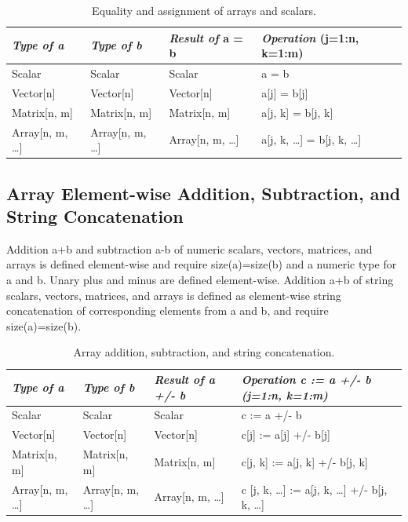 \documentclass[10pt,a4paper]{report}
\def\doublelabel#1{\label{#1}}
\begin{document}
\begin{longtable}[]{|l|l|l|l|}
\caption{Equality and assignment of arrays and scalars.}\\
\hline
\emph{Type of a} & \emph{Type of b} & \emph{Result of} a = b & \emph{Operation} (j=1:n, k=1:m)\\ \hline
\endhead
Scalar & Scalar & Scalar & a = b\\ \hline
Vector{[}n{]} & Vector{[}n{]} & Vector{[}n{]} & a{[}j{]} =
b{[}j{]}\\ \hline
Matrix{[}n, m{]} & Matrix{[}n, m{]} & Matrix{[}n, m{]} & a{[}j, k{]} =
b{[}j, k{]}\\ \hline
Array{[}n, m, \ldots{}{]} & Array{[}n, m, \ldots{}{]} & Array{[}n, m,
\ldots{}{]} & a{[}j, k, \ldots{}{]} = b{[}j, k,
\ldots{}{]}\\ \hline
\end{longtable}

\subsection{Array Element-wise Addition, Subtraction, and String Concatenation}\doublelabel{array-element-wise-addition-subtraction-and-string-concatenation}

Addition a+b and subtraction a-b of numeric scalars, vectors, matrices,
and arrays is defined element-wise and require size(a)=size(b) and a
numeric type for a and b. Unary plus and minus are defined element-wise.
Addition a+b of string scalars, vectors, matrices, and arrays is defined
as element-wise string concatenation of corresponding elements from a
and b, and require size(a)=size(b).

\begin{longtable}[]{|l|l|l|l|}
\caption{Array addition, subtraction, and string concatenation.}\\
\hline
\emph{Type of a} & \emph{Type of b} & \emph{Result of a +/- b} &
\emph{Operation c := a +/- b (j=1:n, k=1:m)}\\ \hline
\endhead
Scalar & Scalar & Scalar & c := a +/- b\\ \hline
Vector{[}n{]} & Vector{[}n{]} & Vector{[}n{]} & c{[}j{]} := a{[}j{]} +/-
b{[}j{]}\\ \hline
Matrix{[}n, m{]} & Matrix{[}n, m{]} & Matrix{[}n, m{]} & c{[}j, k{]} :=
a{[}j, k{]} +/- b{[}j, k{]}\\ \hline
Array{[}n, m, \ldots{}{]} & Array{[}n, m, \ldots{}{]} & Array{[}n, m,
\ldots{}{]} & c {[}j, k, \ldots{}{]} := a{[}j, k, \ldots{}{]} +/- b{[}j,
k, \ldots{}{]}\\ \hline
\end{longtable}
\end{document}
